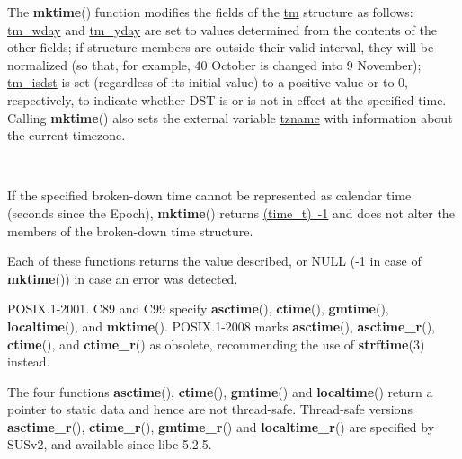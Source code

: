 \documentclass[]{article}
\let\realtextbf=\textbf
\renewcommand{\textbf}[1]{\textcolor{boldcolor}{\realtextbf{#1}}}
\renewcommand{\emph}[1]{\underline{#1}}
\begin{document}
The \textbf{mktime}() function modifies the fields of the \emph{tm}
structure as follows: \emph{tm\_wday} and \emph{tm\_yday} are set to
values determined from the contents of the other fields; if structure
members are outside their valid interval, they will be normalized (so
that, for example, 40 October is changed into 9 November);
\emph{tm\_isdst} is set (regardless of its initial value) to a positive
value or to 0, respectively, to indicate whether DST is or is not in
effect at the specified time. Calling \textbf{mktime}() also sets the
external variable \emph{tzname} with information about the current
timezone.

~

If the specified broken-down time cannot be represented as calendar time
(seconds since the Epoch), \textbf{mktime}() returns \emph{(time\_t)~-1}
and does not alter the members of the broken-down time structure.


Each of these functions returns the value described, or NULL (-1 in case
of \textbf{mktime}()) in case an error was detected.


POSIX.1-2001. C89 and C99 specify \textbf{asctime}(), \textbf{ctime}(),
\textbf{gmtime}(), \textbf{localtime}(), and \textbf{mktime}().
POSIX.1-2008 marks \textbf{asctime}(), \textbf{asctime\_r}(),
\textbf{ctime}(), and \textbf{ctime\_r}() as obsolete, recommending the
use of \textbf{strftime}(3) instead.


The four functions \textbf{asctime}(), \textbf{ctime}(),
\textbf{gmtime}() and \textbf{localtime}() return a pointer to static
data and hence are not thread-safe. Thread-safe versions
\textbf{asctime\_r}(), \textbf{ctime\_r}(), \textbf{gmtime\_r}() and
\textbf{localtime\_r}() are specified by SUSv2, and available since libc
5.2.5.
\end{document}
